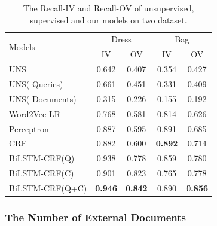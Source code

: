 \begin{table}[th]
	\centering
	\small
	\begin{tabular}{lcccc}
		\toprule
		\multirow{2}{*}{Models} & \multicolumn{2}{c}{Dress} & \multicolumn{2}{c}{Bag}                                   \\
		\cmidrule(lr){2-3} \cmidrule(lr){4-5}
		                        & IV                        & OV                      & IV             & OV             \\
		\midrule
		UNS                     & 0.642                     & 0.407                   & 0.354          & 0.427          \\
		UNS(-Queries)           & 0.661                     & 0.451                   & 0.331          & 0.409          \\
		UNS(-Documents)         & 0.315                     & 0.226                   & 0.155          & 0.192          \\

		\midrule
		Word2Vec-LR             & 0.768                     & 0.581                   & 0.814          & 0.626          \\
		Perceptron              & 0.887                     & 0.595                   & 0.891          & 0.685          \\
		CRF                     & 0.882                     & 0.600                   & \textbf{0.892} & 0.714          \\
		BiLSTM-CRF(Q)           & 0.938                     & 0.778                   & 0.859          & 0.780          \\
		\midrule
		BiLSTM-CRF(C)           & 0.901                     & 0.823                   & 0.765          & 0.778          \\
		BiLSTM-CRF(Q+C)         & \textbf{0.946}            & \textbf{0.842}          & 0.890          & \textbf{0.856} \\
		\bottomrule
	\end{tabular}
	\caption{\small The Recall-IV and Recall-OV of unsupervised, supervised and our models on two dataset.}
	\label{tab:oov}
	\vspace{-10pt}
\end{table}


\subsubsection{The Number of External Documents}

